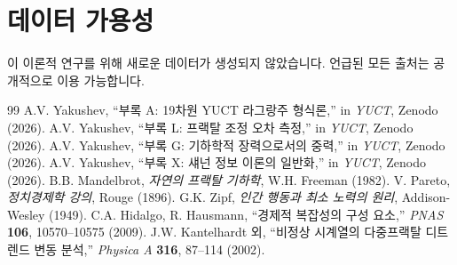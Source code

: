 \documentclass[12pt,a4paper]{article}
\theoremstyle{remark}
\begin{document}
	\section*{데이터 가용성}
	
	이 이론적 연구를 위해 새로운 데이터가 생성되지 않았습니다. 언급된 모든 출처는 공개적으로 이용 가능합니다.
	
	\begin{thebibliography}{99}
		 A.V. Yakushev, ``부록 A: 19차원 YUCT 라그랑주 형식론,'' in \emph{YUCT}, Zenodo (2026).
		 A.V. Yakushev, ``부록 L: 프랙탈 조정 오차 측정,'' in \emph{YUCT}, Zenodo (2026).
		 A.V. Yakushev, ``부록 G: 기하학적 장력으로서의 중력,'' in \emph{YUCT}, Zenodo (2026).
		 A.V. Yakushev, ``부록 X: 섀넌 정보 이론의 일반화,'' in \emph{YUCT}, Zenodo (2026).
		 B.B. Mandelbrot, \emph{자연의 프랙탈 기하학}, W.H. Freeman (1982).
		 V. Pareto, \emph{정치경제학 강의}, Rouge (1896).
		 G.K. Zipf, \emph{인간 행동과 최소 노력의 원리}, Addison-Wesley (1949).
		 C.A. Hidalgo, R. Hausmann, ``경제적 복잡성의 구성 요소,'' \emph{PNAS} \textbf{106}, 10570–10575 (2009).
		 J.W. Kantelhardt 외, ``비정상 시계열의 다중프랙탈 디트렌드 변동 분석,'' \emph{Physica A} \textbf{316}, 87–114 (2002).
	\end{thebibliography}
	
\end{document}
